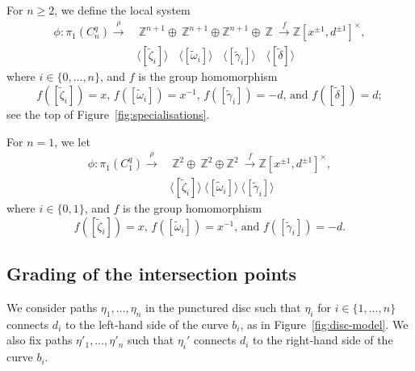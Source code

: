 \documentclass[11pt]{amsart}
\numberwithin{equation}{section}
\numberwithin{figure}{section}
\theoremstyle{definition}
\newcommand{\bZ}{\mathbb{Z}}
\begin{document}
\begin{defn}\label{localsystemg}  
For $n \ge 2$, we define the local system
\begin{equation}
\begin{aligned}
\phi \colon \pi_1\left(C_n^q \right) \stackrel{\rho}{\longrightarrow} & \ \bZ^{n+1} \oplus \ \bZ^{n+1} \oplus \bZ^{n+1} \oplus \ \bZ  \ \stackrel{f}{\longrightarrow}   \bZ[x^{\pm 1}, d^{\pm 1}]^\times, \\
& \langle [\tilde{\zeta}_i] \rangle \ \,\,\,\, \langle [\tilde{\omega}_i]\rangle \ \,\,\,\, \langle [\tilde{\gamma}_i]\rangle  \ \,\,\,\,  \langle [\tilde{\delta}]\rangle
\end{aligned}
\end{equation}
where $i \in \{0,\dots,n\}$, and $f$ is the group homomorphism
\begin{equation}\label{eqn:Localsystem}
f\left([\tilde{\zeta}_i]\right)= x \text{, } f\left([\tilde{\omega}_i]\right)= x^{-1} \text{, } f\left([\tilde{\gamma}_i]\right)= -d \text{, and } f\left([\tilde{\delta}]\right)= d;
\end{equation}
see the top of Figure~\ref{fig:specialisations}.

For $n = 1$, we let
\begin{equation}
\begin{aligned}
\phi \colon \pi_1\left(C_1^q \right) \stackrel{\rho}{\longrightarrow} & \ \bZ^2 \oplus \ \bZ^2 \oplus \bZ^2  \ \stackrel{f}{\longrightarrow}   \bZ[x^{\pm 1}, d^{\pm 1}]^\times, \\
& \langle [\tilde{\zeta}_i] \rangle \  \langle [\tilde{\omega}_i]\rangle \ \langle [\tilde{\gamma}_i]\rangle
\end{aligned}
\end{equation}
where $i \in \{0,1\}$, and $f$ is the group homomorphism
\begin{equation}
f\left([\tilde{\zeta}_i]\right)= x \text{, } f\left([\tilde{\omega}_i]\right)= x^{-1} \text{, and } f\left([\tilde{\gamma}_i]\right)= -d.
\end{equation}
\end{defn}


\subsection{Grading of the intersection points}
We consider paths $\eta_1,\dots,\eta_n$ in the punctured disc such that $\eta_i$ for $i \in \{1,\dots,n\}$ connects $d_i$ to the left-hand side of the curve $b_i$, as in Figure~\ref{fig:disc-model}. We also fix paths $\eta'_1,\dots,\eta'_n$ such that $\eta_i'$ connects $d_i$ to the right-hand side of the curve $b_i$.
\end{document}
